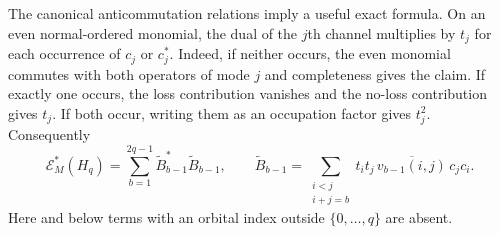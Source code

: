 The canonical anticommutation relations imply a useful exact formula.
On an even normal-ordered monomial, the dual of the $j$th channel
multiplies by $t_j$ for each occurrence of $c_j$ or $c_j^*$.
Indeed, if neither occurs, the even monomial commutes with both operators
of mode $j$ and completeness gives the claim.  If exactly one occurs,
the loss contribution vanishes and the no-loss contribution gives $t_j$.
If both occur, writing them as an occupation factor gives $t_j^2$.
Consequently
\begin{equation}\label{eq:evacuated-interaction}
 \mathcal E_M^*(H_q)=\sum_{b=1}^{2q-1}\widetilde B_{b-1}^*
                                      \widetilde B_{b-1},
 \qquad
 \widetilde B_{b-1}
   =\sum_{\substack{i<j\\i+j=b}}t_it_j\,
                   \overline{v_{b-1}(i,j)}\,c_jc_i.
\end{equation}
Here and below terms with an orbital index outside $\{0,\ldots,q\}$ are
absent.

